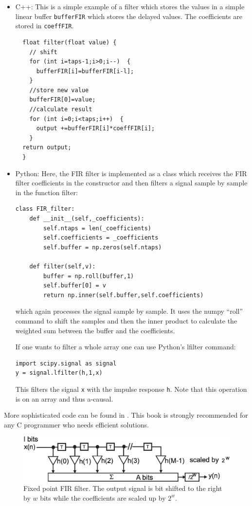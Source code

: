 \documentclass[12pt,a4paper]{article}
\begin{document}
\begin{itemize}
\item C++:
This is a simple example of a filter which stores the values
in a simple linear buffer \texttt{bufferFIR} which stores the
delayed values. The coefficients are stored in \texttt{coeffFIR}.
\begin{verbatim}
  float filter(float value) {
    // shift
    for (int i=taps-1;i>0;i--)  {
      bufferFIR[i]=bufferFIR[i-l];
    }
    //store new value
    bufferFIR[0]=value;
    //calculate result
    for (int i=0;i<taps;i++)  {
      output +=bufferFIR[i]*coeffFIR[i];
    }
  return output;
  }
\end{verbatim}

\item Python: Here, the FIR filter is implemented as a
  class which receives the FIR filter coefficients
  in the constructor and then filters a signal sample
  by sample in the function filter:
  
\begin{verbatim}
class FIR_filter:
    def __init__(self,_coefficients):
        self.ntaps = len(_coefficients)
        self.coefficients = _coefficients
        self.buffer = np.zeros(self.ntaps)

    def filter(self,v):
        buffer = np.roll(buffer,1)
        self.buffer[0] = v
        return np.inner(self.buffer,self.coefficients)
\end{verbatim}
which again processes the signal sample by sample. It uses
the numpy ``roll'' command to shift the samples and then
the inner product to calculate the weighted sum between
the buffer and the coefficients.

If one wants
to filter a whole array one can use Python's lfilter command:
\begin{verbatim}
import scipy.signal as signal
y = signal.lfilter(h,1,x)
\end{verbatim}
This filters the signal \texttt{x} with the impulse response
\texttt{h}. Note that this operation is on an array and thus
a-causal.
\end{itemize}
More sophisticated code can be found in \citet{NumericalRec2007}.
This book is strongly recommended for any C programmer who
needs efficient solutions.


\begin{figure}[!hbt]
\begin{center}
\mbox{\includegraphics[width=\linewidth]{fir_fixed}}
\caption{Fixed point FIR filter. The output signal is bit shifted to the
  right by $w$ bits while the coefficients are scaled up by $2^w$. \label{fir_fixed}}
\end{center}
\end{figure}
\end{document}

